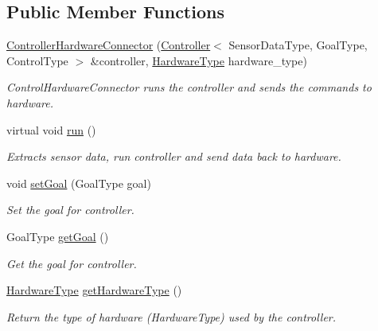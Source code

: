 \subsection*{Public Member Functions}
\begin{DoxyCompactItemize}
\item 
\hyperlink{classControllerHardwareConnector_a6c5d8e5a5ded026ccee3d51f2899ce3e}{Controller\-Hardware\-Connector} (\hyperlink{classController}{Controller}$<$ Sensor\-Data\-Type, Goal\-Type, Control\-Type $>$ \&controller, \hyperlink{base__controller__hardware__connector_8h_ae4dfd42394001deb6e8a0e60c81d6f7a}{Hardware\-Type} hardware\-\_\-type)
\begin{DoxyCompactList}\small\item\em Control\-Hardware\-Connector runs the controller and sends the commands to hardware. \end{DoxyCompactList}\item 
virtual void \hyperlink{classControllerHardwareConnector_afb46464434a3a5881ecc1091f58bbd61}{run} ()
\begin{DoxyCompactList}\small\item\em Extracts sensor data, run controller and send data back to hardware. \end{DoxyCompactList}\item 
void \hyperlink{classControllerHardwareConnector_a14ce51377f80b67796fcb50ce8195efd}{set\-Goal} (Goal\-Type goal)
\begin{DoxyCompactList}\small\item\em Set the goal for controller. \end{DoxyCompactList}\item 
Goal\-Type \hyperlink{classControllerHardwareConnector_a1ea002003e277fc82e04615343b927f5}{get\-Goal} ()
\begin{DoxyCompactList}\small\item\em Get the goal for controller. \end{DoxyCompactList}\item 
\hyperlink{base__controller__hardware__connector_8h_ae4dfd42394001deb6e8a0e60c81d6f7a}{Hardware\-Type} \hyperlink{classControllerHardwareConnector_accd0c9bff560fa3c6d1e60d97644415e}{get\-Hardware\-Type} ()
\begin{DoxyCompactList}\small\item\em Return the type of hardware (Hardware\-Type) used by the controller. \end{DoxyCompactList}\end{DoxyCompactItemize}
